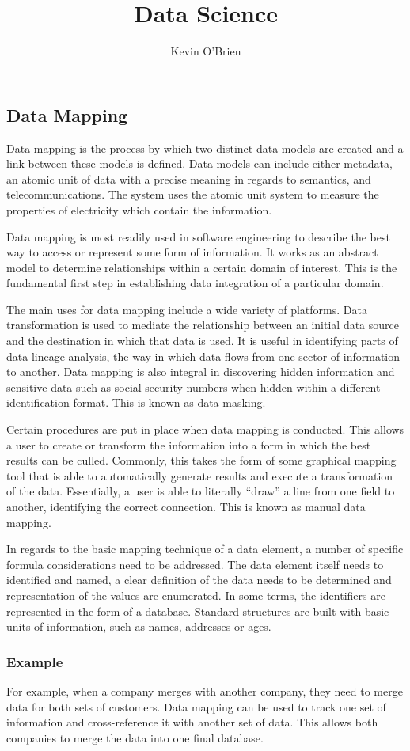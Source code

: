 \documentclass[12pt]{article}
\title{Data Science}
\author{Kevin O'Brien}
\begin{document}
	\large
\subsection*{Data Mapping}
Data mapping is the process by which two distinct data models are created and a link between these models is defined. Data models can include either metadata, an atomic unit of data with a precise meaning in regards to semantics, and telecommunications. The system uses the atomic unit system to measure the properties of electricity which contain the information. 


Data mapping is most readily used in software engineering to describe the best way to access or represent some form of information. It works as an abstract model to determine relationships within a certain domain of interest. This is the fundamental first step in establishing data integration of a particular domain.


The main uses for data mapping include a wide variety of platforms. Data transformation is used to mediate the relationship between an initial data source and the destination in which that data is used. It is useful in identifying parts of data lineage analysis, the way in which data flows from one sector of information to another. Data mapping is also integral in discovering hidden information and sensitive data such as social security numbers when hidden within a different identification format. This is known as data masking.


Certain procedures are put in place when data mapping is conducted. This allows a user to create or transform the information into a form in which the best results can be culled. Commonly, this takes the form of some graphical mapping tool that is able to automatically generate results and execute a transformation of the data. Essentially, a user is able to literally “draw” a line from one field to another, identifying the correct connection. This is known as manual data mapping.

In regards to the basic mapping technique of a data element, a number of specific formula considerations need to be addressed. The data element itself needs to identified and named, a clear definition of the data needs to be determined and representation of the values are enumerated. In some terms, the identifiers are represented in the form of a database. Standard structures are built with basic units of information, such as names, addresses or ages.
\subsubsection{Example}
For example, when a company merges with another company, they need to merge data for both sets of customers. Data mapping can be used to track one set of information and cross-reference it with another set of data. This allows both companies to merge the data into one final database.
\end{document}
